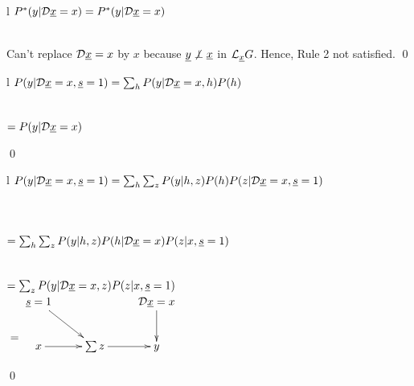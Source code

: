 \begin{claim}
\label{cl-decTransportNon}
\decTransportNon
\end{claim}
\proof
\begin{longtable}{l}
\color{red}
$P^*(y|{\cal D}{\underline{x}}=x)=P^*(y|{\cal D}{\underline{x}}=x)$
\\
\\
\xymatrix{\\=}
\end{longtable}
Can't replace ${\cal D}{\underline{x}}=x$ 
by $x$ because 
${\underline{y}}\not\perp {\underline{x}}$ in 
${\cal L}_{\underline{x}} G$.
Hence, Rule 2 not satisfied.
\qed


\begin{claim}
\label{cl-decTransportTwo}
\decTransportTwo
\end{claim}
\proof
\begin{longtable}{l}
\color{red}
$P(y|{\cal D} {\underline{x}}=x, {\underline{s}}=1)=
\sum_h P(y|{\cal D}{\underline{x}}=x, h)P(h)$
\\
\\
\xymatrix{\\=}
\\
\color{red}
$=P(y|{\cal D}{\underline{x}}=x)$
\\
\xymatrix{=}
\end{longtable}
\qed
\begin{claim}
\label{cl-decTransportThree}
\decTransportThree
\end{claim}
\proof

\begin{longtable}{l}
\color{red}
$P(y|{\cal D}{\underline{x}}=x, {\underline{s}}=1)=
\sum_h
\sum_z P(y|h, z)P(h)
P(z|{\cal D}{\underline{x}}=x, {\underline{s}}=1)$
\\
\\
\\
\\
\color{red}
$=\sum_h\sum_z P(y|h,z)P(h|{\cal D}{\underline{x}}=x)
P(z|x, {\underline{s}}=1)$
\\
\\
\xymatrix{\\=}
\\
\color{red}
$=\sum_z P(y|{\cal D}{\underline{x}}=x, z)P(z|x, {\underline{s}}=1)$
\\
$\xymatrix{\\=}\xymatrix{
\rvs=1\ar[rd]
&&\cald\rvx=x\ar[d]
\\
x\ar[r]
&\sum z\ar[r]
&y
}$
\end{longtable}
\qed

